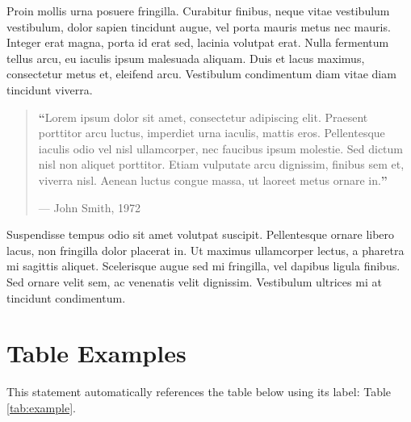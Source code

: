 \documentclass[
	a4paper, %
	12pt, %
]{include/CSSullivanBusinessReport}
\begin{document}
Proin mollis urna posuere fringilla. Curabitur finibus, neque vitae vestibulum vestibulum, dolor sapien tincidunt augue, vel porta mauris metus nec mauris. Integer erat magna, porta id erat sed, lacinia volutpat erat. Nulla fermentum tellus arcu, eu iaculis ipsum malesuada aliquam. Duis et lacus maximus, consectetur metus et, eleifend arcu. Vestibulum condimentum diam vitae diam tincidunt viverra. %

\begin{quote}
	\textbf{\LARGE ``}Lorem ipsum dolor sit amet, consectetur adipiscing elit. Praesent porttitor arcu luctus, imperdiet urna iaculis, mattis eros. Pellentesque iaculis odio vel nisl ullamcorper, nec faucibus ipsum molestie. Sed dictum nisl non aliquet porttitor. Etiam vulputate arcu dignissim, finibus sem et, viverra nisl. Aenean luctus congue massa, ut laoreet metus ornare in.\textbf{''}
	
	\hfill--- John Smith, 1972
\end{quote}

Suspendisse tempus odio sit amet volutpat suscipit. Pellentesque ornare libero lacus, non fringilla dolor placerat in. Ut maximus ullamcorper lectus, a pharetra mi sagittis aliquet. Scelerisque augue sed mi fringilla, vel dapibus ligula finibus. Sed ornare velit sem, ac venenatis velit dignissim. Vestibulum ultrices mi at tincidunt condimentum.


\section{Table Examples}

This statement automatically references the table below using its label: Table \ref{tab:example}.

\end{document}
